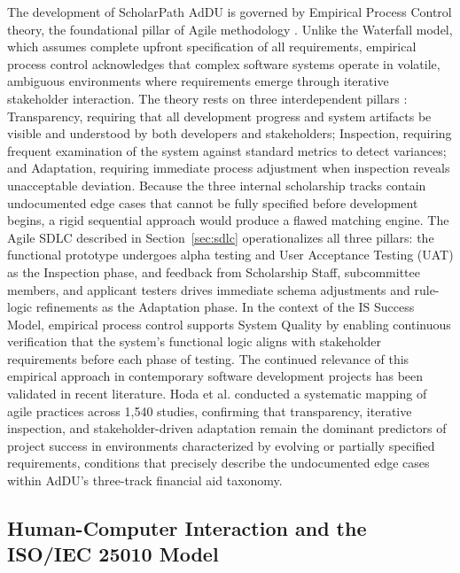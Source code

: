 The development of ScholarPath AdDU is governed by Empirical Process Control theory, the foundational pillar of Agile methodology \cite{ref39}. Unlike the Waterfall model, which assumes complete upfront specification of all requirements, empirical process control acknowledges that complex software systems operate in volatile, ambiguous environments where requirements emerge through iterative stakeholder interaction. The theory rests on three interdependent pillars \cite{ref39}: Transparency, requiring that all development progress and system artifacts be visible and understood by both developers and stakeholders; Inspection, requiring frequent examination of the system against standard metrics to detect variances; and Adaptation, requiring immediate process adjustment when inspection reveals unacceptable deviation. Because the three internal scholarship tracks contain undocumented edge cases that cannot be fully specified before development begins, a rigid sequential approach would produce a flawed matching engine. The Agile SDLC described in Section~\ref{sec:sdlc} operationalizes all three pillars: the functional prototype undergoes alpha testing and User Acceptance Testing (UAT) as the Inspection phase, and feedback from Scholarship Staff, subcommittee members, and applicant testers drives immediate schema adjustments and rule-logic refinements as the Adaptation phase. In the context of the IS Success Model, empirical process control supports System Quality by enabling continuous verification that the system's functional logic aligns with stakeholder requirements before each phase of testing. The continued relevance of this empirical approach in contemporary software development projects has been validated in recent literature. Hoda et al. \cite{ref27} conducted a systematic mapping of agile practices across 1,540 studies, confirming that transparency, iterative inspection, and stakeholder-driven adaptation remain the dominant predictors of project success in environments characterized by evolving or partially specified requirements, conditions that precisely describe the undocumented edge cases within AdDU's three-track financial aid taxonomy.

\subsection{Human-Computer Interaction and the ISO/IEC 25010 Model}

